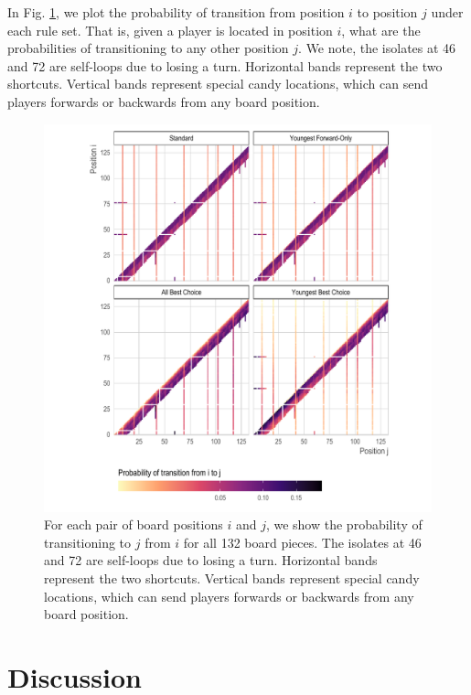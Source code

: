 \documentclass[letterpaper,9pt,twocolumn,twoside,]{pinp}
\begin{document}
In Fig. \ref{fig:p_transitions}, we plot the probability of transition
from position \(i\) to position \(j\) under each rule set. That is,
given a player is located in position \(i\), what are the probabilities
of transitioning to any other position \(j\). We note, the isolates at
46 and 72 are self-loops due to losing a turn. Horizontal bands
represent the two shortcuts. Vertical bands represent special candy
locations, which can send players forwards or backwards from any board
position.

\begin{figure}
  \begin{center}
    \includegraphics[width=6in]{./../../plots/p_transitions.pdf}
    \caption{For each pair of board positions $i$ and $j$, we show the probability of transitioning to $j$ from $i$ for all 132 board pieces. The isolates at 46 and 72 are self-loops due to losing a turn. Horizontal bands represent the two shortcuts. Vertical bands represent special candy locations, which can send players forwards or backwards from any board position.}
    \label{fig:p_transitions}
  \end{center}
\end{figure}

\hypertarget{discussion}{%
\section{Discussion}\label{discussion}}
\end{document}
